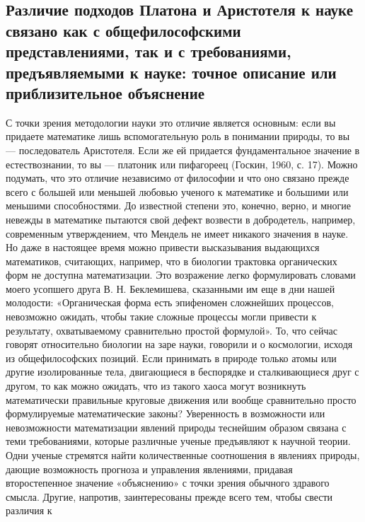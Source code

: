 \subsection{Различие  подходов Платона  и Аристотеля  к науке  связано
как  с   общефилософскими  представлениями,  так  и   с  требованиями,
предъявляемыми   к   науке:   точное  описание   или   приблизительное
объяснение}

С  точки  зрения  методологии  науки это  отличие  является  основным:
если  вы придаете  математике  лишь вспомогательную  роль в  понимании
природы,  то вы  --- последователь  Аристотеля. Если  же ей  придается
фундаментальное  значение   в  естествознании,  то  вы   ---  платоник
или  пифагореец  (Госкин,  1960,  с.  17).  Можно  подумать,  что  это
отличие  независимо от  философии и  что  оно связано  прежде всего  с
большей  или  меньшей любовью  ученого  к  математике и  большими  или
меньшими  способностями. До  известной  степени  это, конечно,  верно,
и  многие  невежды  в  математике  пытаются  свой  дефект  возвести  в
добродетель,  например,  современным   утверждением,  что  Мендель  не
имеет  никакого значения  в науке.  Но  даже в  настоящее время  можно
привести высказывания выдающихся математиков, считающих, например, что
в  биологии трактовка  органических  форм  не доступна  математизации.
Это  возражение  легко  формулировать  словами  моего  усопшего  друга
В.  Н.  Беклемишева,   сказанными  им  еще  в   дни  нашей  молодости:
«Органическая форма  есть эпифеномен сложнейших  процессов, невозможно
ожидать,  чтобы такие  сложные процессы  могли привести  к результату,
охватываемому сравнительно  простой формулой». То, что  сейчас говорят
относительно биологии на  заре науки, говорили и  о космологии, исходя
из общефилософских позиций. Если принимать  в природе только атомы или
другие изолированные  тела, двигающиеся в беспорядке  и сталкивающиеся
друг  с другом,  то  как  можно ожидать,  что  из  такого хаоса  могут
возникнуть  математически  правильные  круговые  движения  или  вообще
сравнительно просто  формулируемые математические  законы? Уверенность
в   возможности  или   невозможности  математизации   явлений  природы
теснейшим  образом  связана  с теми  требованиями,  которые  различные
ученые  предъявляют  к научной  теории.  Одни  ученые стремятся  найти
количественные  соотношения  в  явлениях природы,  дающие  возможность
прогноза  и  управления  явлениями, придавая  второстепенное  значение
«объяснению»  с   точки  зрения  обычного  здравого   смысла.  Другие,
напротив,  заинтересованы прежде  всего тем,  чтобы свести  различия к
